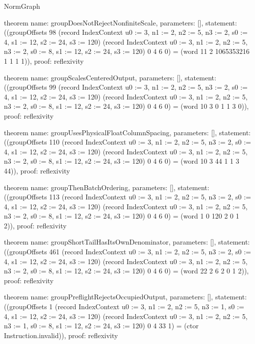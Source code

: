 \begin{lexlean}{NormGraph}
\begin{semanticmodule}
theorem{
  name: groupDoesNotRejectNonfiniteScale,
  parameters: [],
  statement: ((groupOffsets 98 (record IndexContext {u0 := 3, n1 := 2, n2 := 5, n3 := 2, s0 := 4, s1 := 12, s2 := 24, s3 := 120}) (record IndexContext {u0 := 3, n1 := 2, n2 := 5, n3 := 2, s0 := 8, s1 := 12, s2 := 24, s3 := 120}) 0 4 6 0) = (word 11 2 1065353216 1 1 1 1)),
  proof: reflexivity{}
}

theorem{
  name: groupScalesCenteredOutput,
  parameters: [],
  statement: ((groupOffsets 99 (record IndexContext {u0 := 3, n1 := 2, n2 := 5, n3 := 2, s0 := 4, s1 := 12, s2 := 24, s3 := 120}) (record IndexContext {u0 := 3, n1 := 2, n2 := 5, n3 := 2, s0 := 8, s1 := 12, s2 := 24, s3 := 120}) 0 4 6 0) = (word 10 3 0 1 1 3 0)),
  proof: reflexivity{}
}

theorem{
  name: groupUsesPhysicalFloatColumnSpacing,
  parameters: [],
  statement: ((groupOffsets 110 (record IndexContext {u0 := 3, n1 := 2, n2 := 5, n3 := 2, s0 := 4, s1 := 12, s2 := 24, s3 := 120}) (record IndexContext {u0 := 3, n1 := 2, n2 := 5, n3 := 2, s0 := 8, s1 := 12, s2 := 24, s3 := 120}) 0 4 6 0) = (word 10 3 44 1 1 3 44)),
  proof: reflexivity{}
}

theorem{
  name: groupThenBatchOrdering,
  parameters: [],
  statement: ((groupOffsets 113 (record IndexContext {u0 := 3, n1 := 2, n2 := 5, n3 := 2, s0 := 4, s1 := 12, s2 := 24, s3 := 120}) (record IndexContext {u0 := 3, n1 := 2, n2 := 5, n3 := 2, s0 := 8, s1 := 12, s2 := 24, s3 := 120}) 0 4 6 0) = (word 1 0 120 2 0 1 2)),
  proof: reflexivity{}
}

theorem{
  name: groupShortTailHasItsOwnDenominator,
  parameters: [],
  statement: ((groupOffsets 461 (record IndexContext {u0 := 3, n1 := 2, n2 := 5, n3 := 2, s0 := 4, s1 := 12, s2 := 24, s3 := 120}) (record IndexContext {u0 := 3, n1 := 2, n2 := 5, n3 := 2, s0 := 8, s1 := 12, s2 := 24, s3 := 120}) 0 4 6 0) = (word 22 2 6 2 0 1 2)),
  proof: reflexivity{}
}

theorem{
  name: groupPreflightRejectsOccupiedOutput,
  parameters: [],
  statement: ((groupOffsets 1 (record IndexContext {u0 := 3, n1 := 2, n2 := 5, n3 := 1, s0 := 4, s1 := 12, s2 := 24, s3 := 120}) (record IndexContext {u0 := 3, n1 := 2, n2 := 5, n3 := 1, s0 := 8, s1 := 12, s2 := 24, s3 := 120}) 0 4 33 1) = (ctor Instruction.invalid)),
  proof: reflexivity{}
}
\end{semanticmodule}
\end{lexlean}

